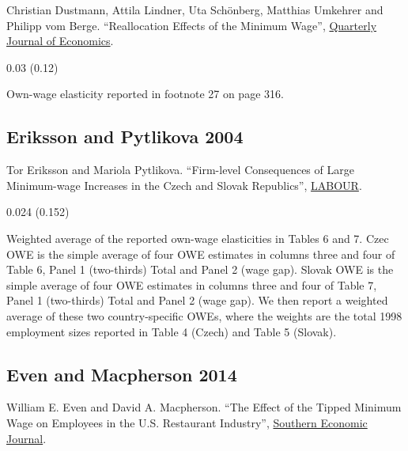 \noindent Christian Dustmann, Attila Lindner, Uta Schönberg, Matthias Umkehrer and Philipp vom Berge. ``Reallocation Effects of the Minimum Wage'', \href{https://doi.org/10.1093/qje/qjab028}{Quarterly Journal of Economics}.

\vspace{0.7em}

 0.03 (0.12)

\vspace{0.7em}

 Own-wage elasticity reported in footnote 27 on page 316.

\subsection*{Eriksson and Pytlikova 2004}
\vspace{-0.7em}

\noindent Tor Eriksson and Mariola Pytlikova. ``Firm-level Consequences of Large Minimum-wage Increases in the Czech and Slovak Republics'', \href{https://doi.org/10.1111/j.1121-7081.2004.00259.x}{LABOUR}.

\vspace{0.7em}

 0.024 (0.152)

\vspace{0.7em}

 Weighted average of the reported own-wage elasticities in Tables 6 and 7. Czec OWE is the simple average of four OWE estimates in columns three and four of Table 6, Panel 1 (two-thirds) Total and Panel 2 (wage gap). Slovak OWE is the simple average of four OWE estimates in columns three and four of Table 7, Panel 1 (two-thirds) Total and Panel 2 (wage gap). We then report a weighted average of these two country-specific OWEs, where the weights are the total 1998 employment sizes reported in Table 4 (Czech) and Table 5 (Slovak).

\subsection*{Even and Macpherson 2014}
\vspace{-0.7em}

\noindent William E. Even and David A. Macpherson. ``The Effect of the Tipped Minimum Wage on Employees in the U.S. Restaurant Industry'', \href{https://doi.org/10.4284/0038-4038-2012.283}{Southern Economic Journal}.

